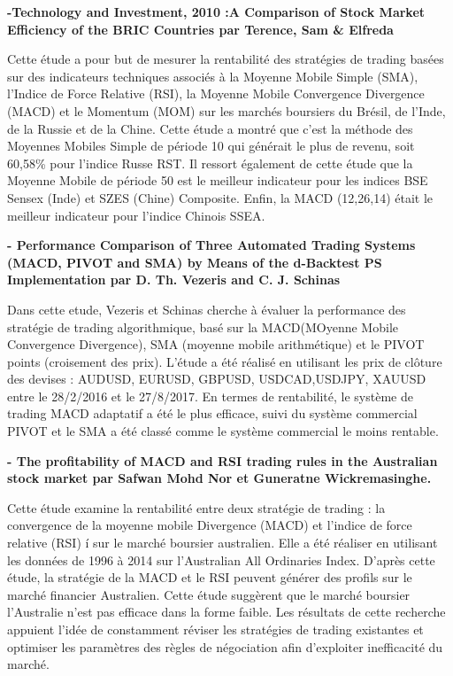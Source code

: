 \textbf{-Technology and Investment, 2010 :A Comparison of Stock Market Efficiency of the BRIC
Countries par Terence, Sam \& Elfreda }
\par{Cette étude a pour but de mesurer la rentabilité des stratégies de trading basées sur 
des indicateurs techniques associés à la Moyenne Mobile Simple (SMA), l'Indice de Force Relative
(RSI), la Moyenne Mobile Convergence Divergence (MACD) et le Momentum (MOM) sur les marchés
boursiers du Brésil, de l'Inde, de la Russie et de la Chine. Cette étude a montré que c'est la 
méthode des Moyennes Mobiles Simple de période 10 qui générait le plus de revenu, soit 60,58\% pour 
l'indice Russe RST. Il ressort également de cette étude que la Moyenne Mobile de période 50 est 
le meilleur indicateur pour les indices BSE Sensex (Inde) et SZES (Chine) Composite.
Enfin, la MACD (12,26,14) était le meilleur indicateur pour l'indice Chinois SSEA.}


\textbf{- Performance Comparison of Three Automated Trading 
Systems (MACD, PIVOT and SMA) by Means of the 
d-Backtest PS Implementation par D. Th. Vezeris and C. J. Schinas}
\par{Dans cette etude, Vezeris et Schinas cherche à évaluer la performance des stratégie
de trading algorithmique, basé sur la MACD(MOyenne Mobile Convergence Divergence),
SMA (moyenne mobile arithmétique) et le PIVOT points (croisement des prix).
L'étude a été réalisé en utilisant les prix de clôture des devises : AUDUSD, 
EURUSD, GBPUSD, USDCAD,USDJPY, XAUUSD entre le 28/2/2016 et le 27/8/2017.
En termes de rentabilité, le système de trading MACD adaptatif a été
le plus efficace, suivi du système commercial PIVOT et
le SMA a été classé comme le système commercial le moins rentable.}

\newpage
\textbf{- The profitability of MACD and RSI trading rules in the Australian 
stock market par Safwan Mohd Nor et Guneratne Wickremasinghe.}
\par{ Cette étude examine la rentabilité entre deux stratégie de trading : la convergence de la moyenne mobile
Divergence (MACD) et l'indice de force relative (RSI) í sur le marché boursier australien.
Elle a été réaliser en utilisant les données de 1996 à 2014 sur l'Australian All Ordinaries Index.
D'après cette étude, la stratégie de la MACD et le RSI peuvent générer des profils 
sur le marché financier Australien. Cette étude suggèrent que le marché boursier
l'Australie n'est pas efficace dans la forme faible. Les résultats
de cette recherche appuient l'idée de constamment
réviser les stratégies de trading existantes et optimiser
les paramètres des règles de négociation afin d'exploiter
inefficacité du marché.}        



